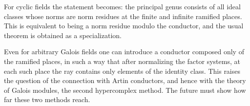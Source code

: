 \documentclass[11pt]{article}
\begin{document}
For cyclic fields the statement becomes: the principal genus consists of all ideal classes whose norms are norm residues at the finite and infinite ramified places. This is equivalent to being a norm residue modulo the conductor, and the usual theorem is obtained as a specialization.

Even for arbitrary Galois fields one can introduce a conductor composed only of the ramified places, in such a way that after normalizing the factor systems, at each such place the ray contains only elements of the identity class. This raises the question of the connection with Artin conductors, and hence with the theory of Galois modules, the second hypercomplex method. The future must show how far these two methods reach.
\end{document}
